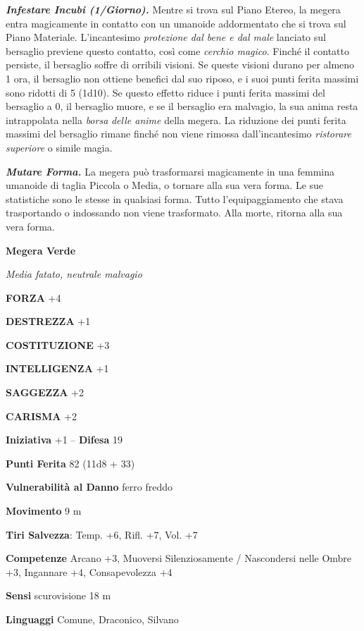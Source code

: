 \begin{multicols}{2}
\emph{\textbf{Infestare Incubi (1/Giorno).}} Mentre si trova sul Piano
Etereo, la megera entra magicamente in contatto con un umanoide
addormentato che si trova sul Piano Materiale. L'incantesimo
\emph{protezione dal bene e dal male} lanciato sul bersaglio previene
questo contatto, così come \emph{cerchio magico}. Finché il contatto
persiste, il bersaglio soffre di orribili visioni. Se queste visioni
durano per almeno 1 ora, il bersaglio non ottiene benefici dal suo
riposo, e i suoi punti ferita massimi sono ridotti di 5 (1d10). Se
questo effetto riduce i punti ferita massimi del bersaglio a 0, il
bersaglio muore, e se il bersaglio era malvagio, la sua anima resta
intrappolata nella \emph{borsa} \emph{delle anime} della megera. La
riduzione dei punti ferita massimi del bersaglio rimane finché non viene
rimossa dall'incantesimo \emph{ristorare} \emph{superiore} o simile
magia.

\emph{\textbf{Mutare Forma.}} La megera può trasformarsi magicamente in
una femmina umanoide di taglia Piccola o Media, o tornare alla sua vera
forma. Le sue statistiche sono le stesse in qualsiasi forma. Tutto
l'equipaggiamento che stava trasportando o indossando non viene
trasformato. Alla morte, ritorna alla sua vera forma.



\medskip{}\textbf{Megera Verde}

\emph{Media fatato, neutrale malvagio}

\textbf{FORZA} +4

\textbf{DESTREZZA} +1

\textbf{COSTITUZIONE} +3

\textbf{INTELLIGENZA} +1

\textbf{SAGGEZZA} +2

\textbf{CARISMA} +2

\textbf{Iniziativa} +1 -- \textbf{Difesa} 19

\textbf{Punti Ferita} 82 (11d8 + 33)

\textbf{Vulnerabilità al Danno} ferro freddo

\textbf{Movimento} 9 m

\textbf{Tiri Salvezza}: Temp. +6, Rifl. +7, Vol. +7

\textbf{Competenze} Arcano +3, Muoversi Silenziosamente / Nascondersi nelle Ombre +3, Ingannare +4, Consapevolezza +4

\textbf{Sensi} scurovisione 18 m

\textbf{Linguaggi} Comune, Draconico, Silvano


\end{multicols}
